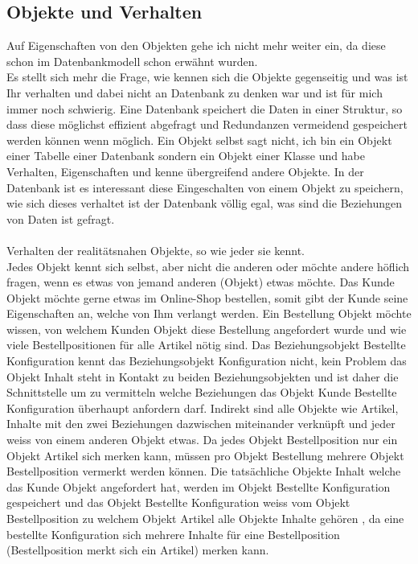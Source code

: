 \documentclass{article}
\begin{document}
\subsection{Objekte und Verhalten}
Auf Eigenschaften von den Objekten gehe ich nicht mehr weiter ein, da diese schon im Datenbankmodell schon erwähnt wurden.\\
Es stellt sich mehr die Frage, wie kennen sich die Objekte gegenseitig und was ist Ihr verhalten und dabei nicht an Datenbank zu denken war und ist für mich immer noch schwierig.
Eine Datenbank speichert die Daten in einer Struktur, so dass diese möglichst effizient abgefragt und Redundanzen vermeidend gespeichert werden können wenn möglich.
Ein Objekt selbst sagt nicht, ich bin ein Objekt einer Tabelle einer Datenbank sondern ein Objekt einer Klasse und habe Verhalten, Eigenschaften und kenne übergreifend andere Objekte.
In der Datenbank ist es interessant diese Eingeschalten von einem Objekt zu speichern, wie sich dieses verhaltet ist der Datenbank völlig egal, was sind die Beziehungen von Daten ist gefragt.\\
\\
Verhalten der realitätsnahen Objekte, so wie jeder sie kennt.\\
Jedes Objekt kennt sich selbst, aber nicht die anderen oder möchte andere höflich fragen, wenn es etwas von jemand anderen (Objekt) etwas möchte.
Das Kunde Objekt möchte gerne etwas im Online-Shop bestellen, somit gibt der Kunde seine Eigenschaften an, welche von Ihm verlangt werden.
Ein Bestellung Objekt möchte wissen, von welchem Kunden Objekt diese Bestellung angefordert wurde und wie viele Bestellpositionen für alle Artikel nötig sind.
Das Beziehungsobjekt Bestellte Konfiguration kennt das Beziehungsobjekt Konfiguration nicht, kein Problem das Objekt Inhalt steht in Kontakt zu beiden Beziehungsobjekten
und ist daher die Schnittstelle um zu vermitteln welche Beziehungen das Objekt Kunde Bestellte Konfiguration überhaupt anfordern darf.
Indirekt sind alle Objekte wie Artikel, Inhalte mit den zwei Beziehungen dazwischen miteinander verknüpft und jeder weiss von einem anderen Objekt etwas.
Da jedes Objekt Bestellposition nur ein Objekt Artikel sich merken kann, müssen pro Objekt Bestellung mehrere Objekt Bestellposition vermerkt werden können.
Die tatsächliche Objekte Inhalt welche das Kunde Objekt angefordert hat, werden im Objekt Bestellte Konfiguration gespeichert und das Objekt Bestellte Konfiguration weiss vom Objekt Bestellposition zu welchem Objekt Artikel alle Objekte Inhalte gehören
, da eine bestellte Konfiguration sich mehrere Inhalte für eine Bestellposition (Bestellposition merkt sich ein Artikel) merken kann.\\
\end{document}
